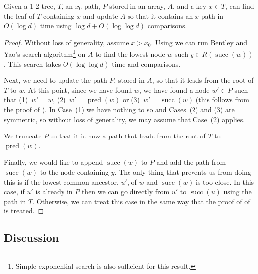 \documentclass{patmorin}
\DeclareMathOperator{\scc}{succ}
\DeclareMathOperator{\pred}{pred}
\begin{document}
\begin{lem}
  Given a 1-2 tree, $T$, an $x_0$-path, $P$ stored in an array, $A$, and
  a key $x\in T$, can find the leaf of $T$ containing $x$ and update $A$
  so that it contains an $x$-path in $O(\log d)$ time using $\log d +
  O(\log\log d)$ comparisons.
\end{lem}

\begin{proof}
  Without loss of generality, assume $x>x_0$.  Using
   we can run Bentley and Yao's search
  algorithm\footnote{Simple exponential search is also sufficient for
  this result.} on $A$ to find the lowest node $w$ such $y\in R(\scc(w))$.
  This search takes $O(\log\log d)$ time and comparisons.

  Next, we need to update the path $P$, stored in $A$, so that it
  leads from the root of $T$ to $w$.  At this point, since we have
  found $w$, we have found a node $w'\in P$ such that (1)~$w'=w$,
  (2)~$w'=\pred(w)$ or (3)~$w'=\scc(w)$ (this follows from the proof
  of ).  In Case~(1) we have nothing to so and
  Cases~(2) and (3) are symmetric, so without loss of generality, we
  may assume that Case~(2) applies.

  We truncate $P$ so that it is now a path that leads from the root of $T$
  to $\pred(w)$.

  Finally, we would like to append $\scc(w)$ to $P$ and add the path from
  $\scc(w)$ to the node containing $y$.  The only thing that prevents
  us from doing this is if the lowest-common-ancestor, $u'$, of $w$
  and $\scc(w)$ is too close.  In this case, if $u'$ is already in $P$
  then we can go directly from $u'$ to $\scc(u)$ using the path in $T$.
  Otherwise, we can treat this case in the same way that the proof of
  of  is treated.
\end{proof}

\subsection{Discussion}
\end{document}
